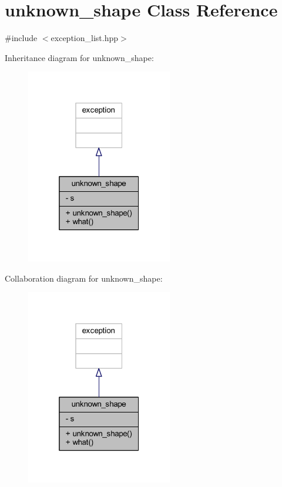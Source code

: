 \hypertarget{classunknown__shape}{}\section{unknown\+\_\+shape Class Reference}
\label{classunknown__shape}


{\ttfamily \#include $<$exception\+\_\+list.\+hpp$>$}



Inheritance diagram for unknown\+\_\+shape\+:
\nopagebreak
\begin{figure}[H]
\begin{center}
\leavevmode
\includegraphics[width=181pt]{classunknown__shape__inherit__graph}
\end{center}
\end{figure}


Collaboration diagram for unknown\+\_\+shape\+:
\nopagebreak
\begin{figure}[H]
\begin{center}
\leavevmode
\includegraphics[width=181pt]{classunknown__shape__coll__graph}
\end{center}
\end{figure}
